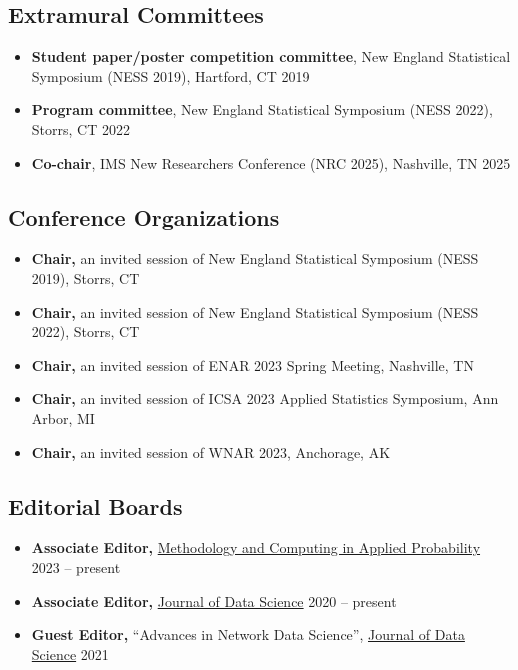 \documentclass[12pt]{article}
\begin{document}
	\subsection*{Extramural Committees}
	\begin{itemize}
		\item {\bf Student paper/poster competition committee}, New England Statistical Symposium (NESS 2019), Hartford, CT \hfill 2019
		\item {\bf Program committee}, New England Statistical Symposium (NESS 2022), Storrs, CT \hfill 2022
		\item {\bf Co-chair}, IMS New Researchers Conference (NRC 2025), Nashville, TN \hfill 2025
	\end{itemize}
	
	\subsection*{Conference Organizations}
	\begin{itemize}
		\item {\bf Chair,} an invited session of New England Statistical Symposium (NESS 2019), Storrs, CT
		\item {\bf Chair,} an invited session of New England Statistical Symposium (NESS 2022), Storrs, CT
		\item {\bf Chair,} an invited session of ENAR 2023 Spring Meeting, Nashville, TN
		\item {\bf Chair,} an invited session of ICSA 2023 Applied 
		Statistics Symposium, Ann Arbor, MI
		\item {\bf Chair,} an invited session of WNAR 2023, 
		Anchorage, AK
	\end{itemize}
	
	
	\subsection*{Editorial Boards}
	\begin{itemize}
		\item \textbf{Associate Editor,}
		\href{https://www.springer.com/journal/11009/}{Methodology 
		and Computing in Applied Probability} \hfill 2023 -- present
		\item \textbf{Associate Editor,} 
		\href{https://jds-online.org/journal/JDS}{Journal of Data Science} \hfill 2020 -- present
		\item \textbf{Guest Editor,} ``Advances in Network Data 
		Science'', \href{https://jds-online.org/journal/JDS}{Journal of Data Science} \hfill 2021
	\end{itemize}
\end{document}
